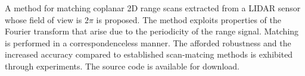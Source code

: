 A method for matching coplanar 2D range scans extracted from a LIDAR sensor
whose field of view is $2\pi$ is proposed. The method exploits properties of
the Fourier transform that arise due to the periodicity of the range signal.
Matching is performed in a correspondenceless manner. The afforded robustness
and the increased accuracy compared to established scan-matcing methods is
exhibited through experiments. The source code is available for download.
